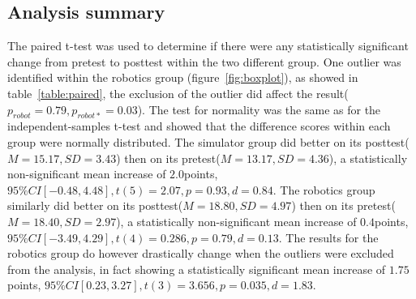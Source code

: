 \subsection{Analysis summary}
The paired t-test was used to determine if there were any statistically significant change from pretest to posttest within the two different group. One outlier was identified within the robotics group (figure~\ref{fig:boxplot}), as showed in table~\ref{table:paired}, the exclusion of the outlier did affect the result($p_{robot} = 0.79, p_{robot*} = 0.03$).
The test for normality was the same as for the independent-samples t-test and showed that the difference scores within each group were normally distributed. 
The simulator group did better on its posttest($M = 15.17, SD = 3.43$) then on its pretest($M = 13.17, SD = 4.36$), a statistically non-significant mean increase of $2.0$points, $95\%CI[-0.48,4.48],t(5)=2.07,p=0.93,d=0.84$.
The robotics group similarly did better on its posttest($M=18.80, SD = 4.97$) then on its pretest($M = 18.40, SD = 2.97$), a statistically non-significant mean increase of $0.4$points, $95\%CI[-3.49,4.29],t(4)=0.286,p=0.79,d=0.13$. The results for the robotics group do however drastically change when the outliers were excluded from the analysis, in fact showing a statistically significant mean increase of $1.75$points, $95\%CI[0.23,3.27],t(3)=3.656,p=0.035,d=1.83$.


